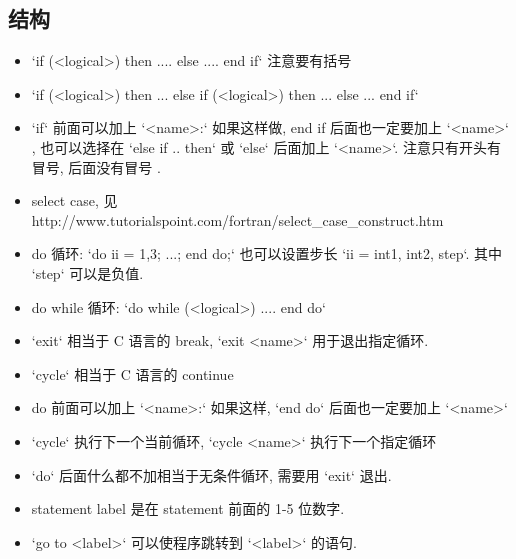\subsection{结构}
\begin{itemize}
\item `if (<logical>) then ....  else .... end if` 注意要有括号
\item `if (<logical>) then ... else if (<logical>) then ... else ... end if`
\item `if` 前面可以加上 `<name>:` 如果这样做,  end if 后面也一定要加上 `<name>`  , 也可以选择在 `else if .. then` 或 `else` 后面加上 `<name>`. 注意只有开头有冒号, 后面没有冒号 .
\item select case, 见 http://www.tutorialspoint.com/fortran/select_case_construct.htm
\item do 循环:   `do ii = 1,3; ...; end do;` 也可以设置步长 `ii = int1, int2, step`. 其中 `step` 可以是负值.
\item do while 循环: `do while (<logical>) ....  end do`
\item `exit` 相当于 C 语言的 break, `exit <name>` 用于退出指定循环.
\item `cycle` 相当于 C 语言的 continue
\item do 前面可以加上 `<name>:` 如果这样, `end do` 后面也一定要加上 `<name>`
\item `cycle` 执行下一个当前循环, `cycle <name>` 执行下一个指定循环
\item `do` 后面什么都不加相当于无条件循环, 需要用 `exit` 退出.
\item statement label 是在 statement 前面的 1-5 位数字.
\item `go to <label>` 可以使程序跳转到 `<label>` 的语句.
\end{itemize}

